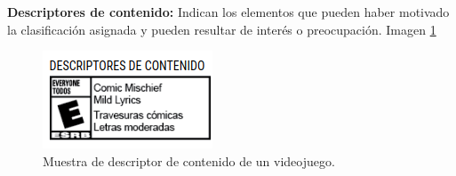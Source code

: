 			\textbf{Descriptores de contenido: } 
			Indican los elementos que pueden haber motivado la clasificación asignada y pueden resultar de interés o preocupación. Imagen \ref{fig:clasDes} 
			\\[1pt]
				\begin{figure}
				\centering
				\includegraphics[width=\textwidth]{03MarcoTeorico/imageR/clasDes}
				\caption{Muestra de descriptor de contenido de un videojuego.}
				\label{fig:clasDes}
			\end{figure}
			
